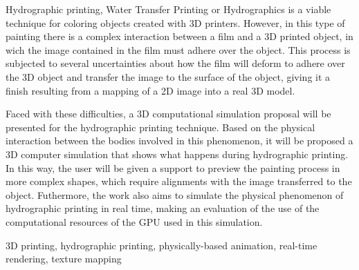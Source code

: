 \abstract

Hydrographic printing, Water Transfer Printing or Hydrographics is a viable technique for coloring objects created with 3D printers. However, in this type of painting there is a complex interaction between a film and a 3D printed object, in wich the image contained in the film must adhere over the object. This process is subjected to several uncertainties about how the film will deform to adhere over the 3D object and transfer the image to the surface of the object, giving it a finish resulting from a mapping of a 2D image into a real 3D model.

Faced with these difficulties, a 3D computational simulation proposal will be presented for the hydrographic printing technique. Based on the physical interaction between the bodies involved in this phenomenon, it will be proposed a 3D computer simulation that shows what happens during hydrographic printing. In this way, the user will be given a support to preview the painting process in more complex shapes, which require alignments with the image transferred to the object. Futhermore, the work also aims to simulate the physical phenomenon of hydrographic printing in real time, making an evaluation of the use of the computational resources of the \ac{GPU} used in this simulation.

\begin{keywords}
3D printing, hydrographic printing, physically-based animation, real-time rendering, texture mapping
\end{keywords}

